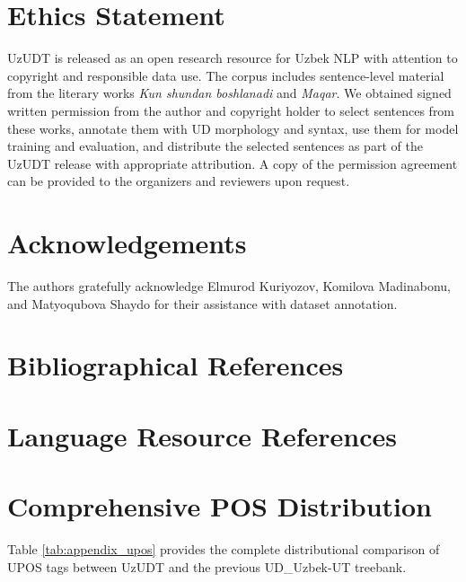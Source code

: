 \documentclass[10pt, a4paper]{article}
\begin{document}
\section{Ethics Statement}
\label{sec:ethics}
UzUDT is released as an open research resource for Uzbek NLP with attention to copyright and responsible data use.
The corpus includes sentence-level material from the literary works \textit{Kun shundan boshlanadi} and \textit{Maqar}.
We obtained signed written permission from the author and copyright holder to select sentences from these works, annotate them with UD morphology and syntax, use them for model training and evaluation, and distribute the selected sentences as part of the UzUDT release with appropriate attribution. A copy of the permission agreement can be provided to the organizers and reviewers upon request.

\section{Acknowledgements}
The authors gratefully acknowledge Elmurod Kuriyozov, Komilova Madinabonu, and Matyoqubova Shaydo for their assistance with dataset annotation.
\section{Bibliographical References}
\label{sec:reference}



\section{Language Resource References}
\label{lr:ref}


\appendix
\section{Comprehensive POS Distribution}
\label{sec:appendix_upos}

Table \ref{tab:appendix_upos} provides the complete distributional comparison of UPOS tags between UzUDT and the previous UD\_Uzbek-UT treebank. 
\end{document}

